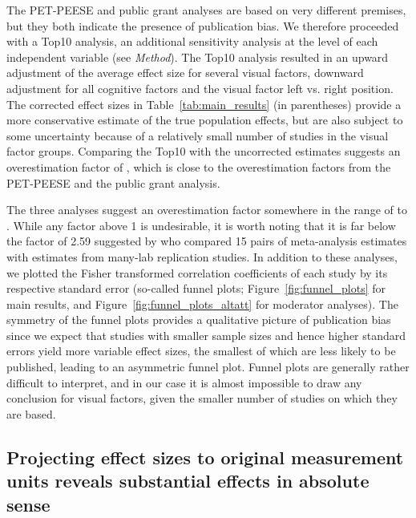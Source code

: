 The PET-PEESE and public grant analyses are based on very different premises, but they both indicate the presence of publication bias. We therefore proceeded with a Top10 analysis, an additional sensitivity analysis at the level of each independent variable (see \textit{Method}). The Top10 analysis resulted in an upward adjustment of the average effect size for several visual factors, downward adjustment for all cognitive factors and the visual factor left vs. right position. The corrected effect sizes in Table~\ref{tab:main_results} (in parentheses) provide a more conservative estimate of the true population effects, but are also subject to some uncertainty because of a relatively small number of studies in the visual factor groups. Comparing the Top10 with the uncorrected estimates suggests an overestimation factor of \unskip, which is close to the overestimation factors from the PET-PEESE and the public grant analysis.

The three analyses suggest an overestimation factor somewhere in the range of  to \unskip. While any factor above 1 is undesirable, it is worth noting that it is far below the factor of 2.59 suggested by \cite{kvarven2020} who compared 15 pairs of meta-analysis estimates with estimates from many-lab replication studies. In addition to these analyses, we plotted the Fisher transformed correlation coefficients of each study by its respective standard error (so-called funnel plots; Figure~\ref{fig:funnel_plots} for main results, and Figure~\ref{fig:funnel_plots_altatt} for moderator analyses). The symmetry of the funnel plots provides a qualitative picture of publication bias since we expect that studies with smaller sample sizes and hence higher standard errors yield more variable effect sizes, the smallest of which are less likely to be published, leading to an asymmetric funnel plot. Funnel plots are generally rather difficult to interpret, and in our case it is almost impossible to draw any conclusion for visual factors, given the smaller number of studies on which they are based.




\subsection{Projecting effect sizes to original measurement units reveals substantial effects in absolute sense}

